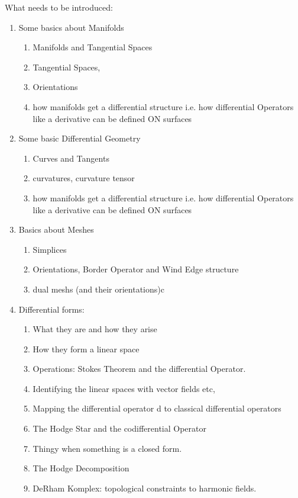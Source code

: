 What needs to be introduced:
\begin{enumerate}
\item Some basics about Manifolds
	\begin{enumerate}
		\item Manifolds and Tangential Spaces
		\item Tangential Spaces, 
		\item Orientations
		\item how manifolds get a differential structure i.e. how differential Operators like a derivative can be defined ON surfaces
	\end{enumerate}
\item Some basic Differential Geometry
	\begin{enumerate}
		\item Curves and Tangents
		\item curvatures, curvature tensor
		\item how manifolds get a differential structure i.e. how differential Operators like a derivative can be defined ON surfaces
	\end{enumerate}
\item Basics about Meshes
	\begin{enumerate}
		\item Simplices
		\item Orientations, Border Operator and Wind Edge structure
		\item dual meshs (and their orientations)c
	\end{enumerate}
\item Differential forms:
	\begin{enumerate}
		\item What they are and how they arise
		\item How they form a linear space
		\item Operations: Stokes Theorem and the differential Operator.
		\item Identifying the linear spaces with vector fields etc,
		\item Mapping the differential operator d to classical differential operators
		\item The Hodge Star and the codifferential Operator
		\item Thingy when something is a closed form.
		\item The Hodge Decomposition
		\item DeRham Komplex: topological constraints to harmonic fields.
	\end{enumerate}

\end{enumerate}
